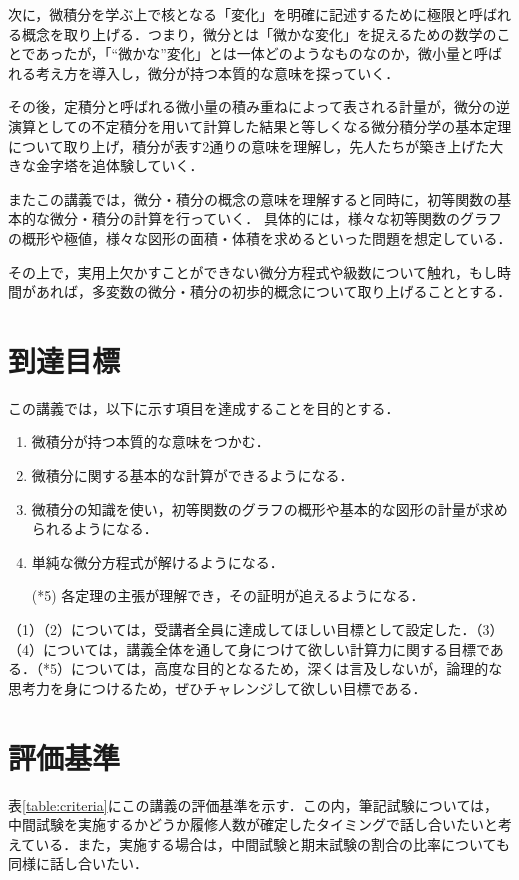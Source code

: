 次に，微積分を学ぶ上で核となる「変化」を明確に記述するために極限と呼ばれる概念を取り上げる．つまり，微分とは「微かな変化」を捉えるための数学のことであったが，「``微かな''変化」とは一体どのようなものなのか，微小量と呼ばれる考え方を導入し，微分が持つ本質的な意味を探っていく．

その後，定積分と呼ばれる微小量の積み重ねによって表される計量が，微分の逆演算としての不定積分を用いて計算した結果と等しくなる微分積分学の基本定理について取り上げ，積分が表す2通りの意味を理解し，先人たちが築き上げた大きな金字塔を追体験していく．

またこの講義では，微分・積分の概念の意味を理解すると同時に，初等関数の基本的な微分・積分の計算を行っていく．
具体的には，様々な初等関数のグラフの概形や極値，様々な図形の面積・体積を求めるといった問題を想定している．

その上で，実用上欠かすことができない微分方程式や級数について触れ，もし時間があれば，多変数の微分・積分の初歩的概念について取り上げることとする．

\section{到達目標}
この講義では，以下に示す項目を達成することを目的とする．
\begin{enumerate}[(1)]
	\item 微積分が持つ本質的な意味をつかむ．
	\item 微積分に関する基本的な計算ができるようになる．
	\item 微積分の知識を使い，初等関数のグラフの概形や基本的な図形の計量が求められるようになる．
	\item 単純な微分方程式が解けるようになる．
	\item[(*5)] 各定理の主張が理解でき，その証明が追えるようになる．
\end{enumerate}

（1）（2）については，受講者全員に達成してほしい目標として設定した．（3）（4）については，講義全体を通して身につけて欲しい計算力に関する目標である．（*5）については，高度な目的となるため，深くは言及しないが，論理的な思考力を身につけるため，ぜひチャレンジして欲しい目標である．

\section{評価基準}
表\ref{table:criteria}にこの講義の評価基準を示す．この内，筆記試験については，中間試験を実施するかどうか履修人数が確定したタイミングで話し合いたいと考えている．また，実施する場合は，中間試験と期末試験の割合の比率についても同様に話し合いたい．

